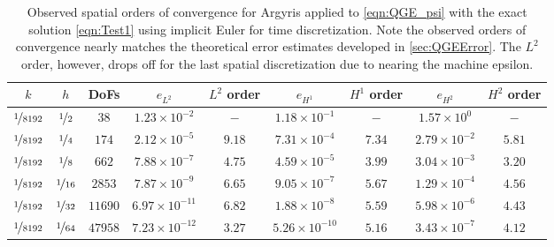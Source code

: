 \begin{table}
  \begin{center}
    \begin{tabular}{|c|c|c|c|c|c|c|c|c|}
      \hline
      $k$ & $h$ & DoFs & $e_{L^2}$ & $L^2$ order & $e_{H^1}$ & $H^1$ order & $e_{H^2}$ & $H^2$ order \\
      \hline
      $\nicefrac{1}{8192}$ & $\nicefrac{1}{2}$ & $38$ & $1.23\times 10^{-2}$ & $-$ & $1.18\times 10^{-1}$ & $-$ & $1.57\times 10^0$ & $-$ \\[0.2em]
      $\nicefrac{1}{8192}$ & $\nicefrac{1}{4}$ & $174$ & $2.12\times 10^{-5}$ & $9.18$ & $7.31\times 10^{-4}$ & $7.34$ & $2.79\times 10^{-2}$ & $5.81$ \\[0.2em]
      $\nicefrac{1}{8192}$ & $\nicefrac{1}{8}$ & $662$ & $7.88\times 10^{-7}$ & $4.75$ & $4.59\times 10^{-5}$ & $3.99$ & $3.04\times 10^{-3}$ & $3.20$ \\[0.2em]
      $\nicefrac{1}{8192}$ & $\nicefrac{1}{16}$ & $2853$ & $7.87\times 10^{-9}$ & $6.65$ & $9.05\times 10^{-7}$ & $5.67$ & $1.29\times 10^{-4}$ & $4.56$ \\[0.2em]
      $\nicefrac{1}{8192}$ & $\nicefrac{1}{32}$ & $11690$ & $6.97\times 10^{-11}$ & $6.82$ & $1.88\times 10^{-8}$ & $5.59$ & $5.98\times 10^{-6}$ & $4.43$ \\[0.2em]
      $\nicefrac{1}{8192}$ & $\nicefrac{1}{64}$ & $47958$ & $7.23\times 10^{-12}$ & $3.27$ & $5.26\times 10^{-10}$ & $5.16$ & $3.43\times 10^{-7}$ & $4.12$ \\[0.2em]
      \hline
    \end{tabular}
  \end{center}
  \caption{Observed spatial orders of convergence for Argyris applied to
    \eqref{eqn:QGE_psi} with the exact solution \eqref{eqn:Test1} using implicit
    Euler for time discretization. Note the observed orders of convergence
    nearly matches the theoretical error estimates developed in
    \autoref{sec:QGEError}. The $L^2$ order, however, drops off for the last
    spatial discretization due to nearing the machine epsilon.}
  \label{tab:Test1Space}
\end{table}

